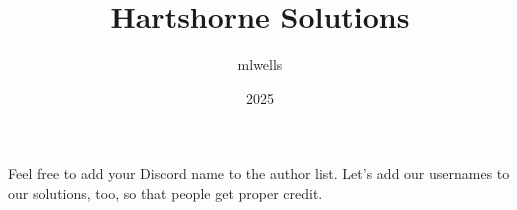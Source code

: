 \documentclass{article}
\title{Hartshorne Solutions}
\author{mlwells}
\date{2025}
\begin{document}
\maketitle
Feel free to add your Discord name to the author list.  Let's add our usernames to our solutions, too, so that people get proper credit.

\tableofcontents


\end{document}

